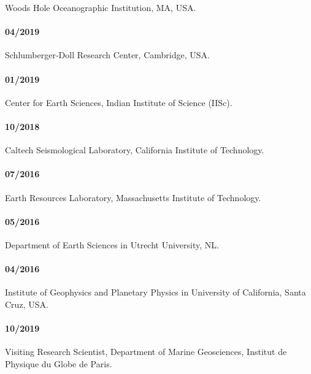 \documentclass[9pt]{developercv} %
\begin{document}
Woods Hole
Oceanographic
Institution,
MA, USA.

\paragraph{04/2019}\label{section-10}

Schlumberger-Doll
Research
Center,
Cambridge,
USA.

\paragraph{01/2019}\label{section-11}

Center for
Earth
Sciences,
Indian
Institute
of Science
(IISc).

\paragraph{10/2018}\label{section-12}

Caltech
Seismological
Laboratory,
California
Institute
of
Technology.

\paragraph{07/2016}\label{section-13}

Earth
Resources
Laboratory,
Massachusetts
Institute
of
Technology.

\paragraph{05/2016}\label{section-14}

Department
of Earth
Sciences
in Utrecht
University,
NL.

\paragraph{04/2016}\label{section-15}

Institute
of
Geophysics
and
Planetary
Physics in
University
of
California,
Santa
Cruz, USA.

\label{short-term-academic-visits}

\paragraph{10/2019}\label{section-16}

Visiting
Research
Scientist,
Department
of Marine
Geosciences,
Institut
de
Physique
du Globe
de Paris.
\end{document}
